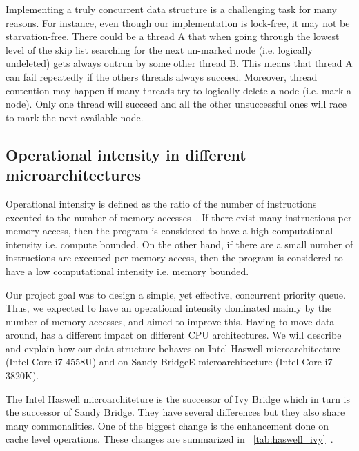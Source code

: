 Implementing a truly concurrent data structure is a challenging task for many reasons. For instance, even though our implementation is lock-free, it may not be starvation-free. There could be a thread A that when going through the lowest level of the skip list searching for the next un-marked node (i.e. logically undeleted) gets always outrun by some other thread B. This means that thread A can fail repeatedly if the others threads always succeed. Moreover, thread contention may happen if many threads try to logically delete a node (i.e. mark a node). Only one thread will succeed and all the other unsuccessful ones will race to mark
the next available node.\\


\subsection{Operational intensity in different microarchitectures}
Operational intensity is defined as the ratio of the number of instructions executed to the number of memory accesses~\cite{roger1996science}. If there exist many instructions per memory access, then the program is considered to have a high computational intensity i.e. compute bounded. On the other hand, if there are a small number of instructions are executed per memory access, then the program is considered to have a low computational intensity i.e. memory bounded.

Our project goal was to design a simple, yet effective, concurrent priority queue. Thus, we expected to have an operational intensity dominated mainly by the number of memory accesses, and aimed to improve this. Having to move data around, has a different impact on different CPU architectures. We will describe and explain how our data structure behaves on Intel Haswell microarchitecture (Intel Core i7-4558U) and on Sandy BridgeE microarchitecture (Intel Core i7-3820K). 

The Intel Haswell microarchiteture is the successor of Ivy Bridge which in turn is the successor of Sandy Bridge. They have several differences but they also share many commonalities. One of the biggest change is the enhancement done on cache level operations. These changes are summarized in \tablename~\ref{tab:haswell_ivy}~\cite{ijcsit2013040321, microarchitecture, haswell_arch}.

